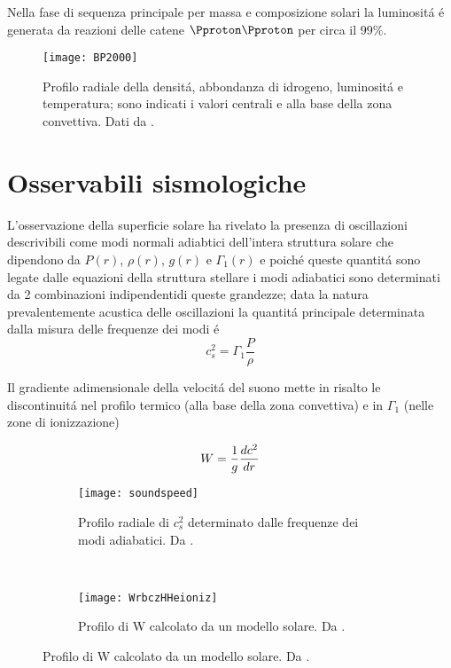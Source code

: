 \documentclass[../main.tex]{subfiles}
\begin{document}
\begin{workout}
Nella fase di sequenza principale per massa e composizione solari la luminosit\'a \'e generata da reazioni delle catene $\Pproton\Pproton$ per circa il $99\%$.
\end{workout}

\begin{figure}[!h]
\texttt{[image: BP2000]}
\caption{Profilo radiale della densit\'a, abbondanza di idrogeno, luminosit\'a e temperatura; sono indicati i valori centrali e alla base della zona convettiva. Dati da \cite{BP2000}.}
\end{figure}

\section{Osservabili sismologiche}

L'osservazione della superficie solare ha rivelato la presenza di oscillazioni descrivibili come modi normali adiabtici dell'intera struttura solare che dipendono da $P(r)$, $\rho(r)$, $g(r)$ e $\Gamma_1(r)$ e poich\'e queste quantit\'a sono legate dalle equazioni della struttura stellare i modi adiabatici sono determinati da 2 combinazioni indipendentidi queste grandezze; data la natura prevalentemente acustica delle oscillazioni la quantit\'a principale determinata dalla misura delle frequenze dei modi \'e
\begin{equation}
c_s^2=\Gamma_1\frac{P}{\rho}
\end{equation}

Il gradiente adimensionale della velocit\'a del suono mette in risalto le discontinuit\'a nel profilo termico (alla base della zona convettiva) e in $\Gamma_1$ (nelle zone di ionizzazione)

\begin{equation}
W=\frac{1}{g}\TDy{r}{c^2}
\end{equation}

\begin{figure}[!h]
\begin{subfigure}[r]{0.4\textwidth}
        \texttt{[image: soundspeed]}
        \caption{Profilo radiale di $c_s^2$ determinato dalle frequenze dei modi adiabatici. Da \cite{christensen1985speed}.}
    \end{subfigure}
~
\begin{subfigure}[r]{0.6\textwidth}
        \texttt{[image: WrbczHHeioniz]}
        \caption{Profilo di W calcolato da un modello solare. Da \cite{basu2008helioseismology}.}
    \end{subfigure}
\end{figure}
\end{document}
